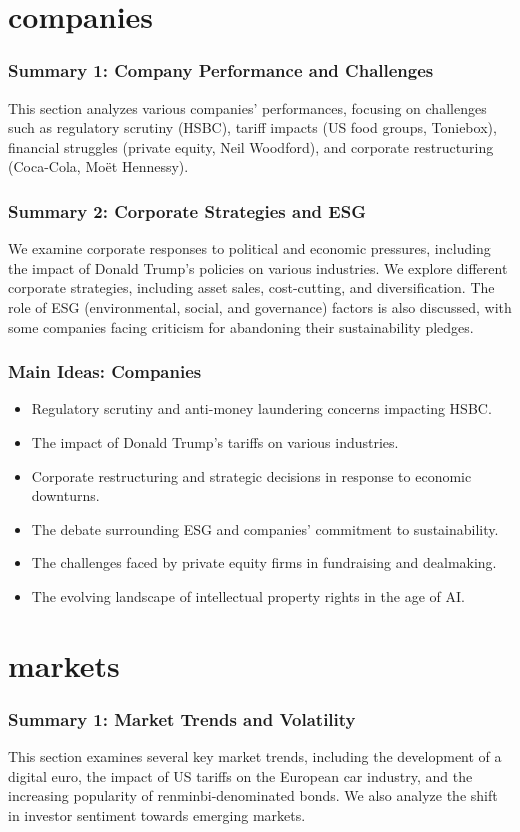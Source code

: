 \documentclass{beamer}
\begin{document}
\section{companies}

\begin{frame}
\frametitle{Summary 1: Company Performance and Challenges}
This section analyzes various companies' performances, focusing on challenges such as regulatory scrutiny (HSBC), tariff impacts (US food groups, Toniebox), financial struggles (private equity, Neil Woodford), and corporate restructuring (Coca-Cola, Moët Hennessy).
\end{frame}

\begin{frame}
\frametitle{Summary 2: Corporate Strategies and ESG}
We examine corporate responses to political and economic pressures, including the impact of Donald Trump's policies on various industries. We explore different corporate strategies, including asset sales, cost-cutting, and diversification. The role of ESG (environmental, social, and governance) factors is also discussed, with some companies facing criticism for abandoning their sustainability pledges.
\end{frame}

\begin{frame}
\frametitle{Main Ideas: Companies}
\begin{itemize}
    \item Regulatory scrutiny and anti-money laundering concerns impacting HSBC.
    \item The impact of Donald Trump's tariffs on various industries.
    \item Corporate restructuring and strategic decisions in response to economic downturns.
    \item The debate surrounding ESG and companies' commitment to sustainability.
    \item The challenges faced by private equity firms in fundraising and dealmaking.
    \item The evolving landscape of intellectual property rights in the age of AI.
\end{itemize}
\end{frame}


\section{markets}

\begin{frame}
\frametitle{Summary 1: Market Trends and Volatility}
This section examines several key market trends, including the development of a digital euro, the impact of US tariffs on the European car industry, and the increasing popularity of renminbi-denominated bonds. We also analyze the shift in investor sentiment towards emerging markets.
\end{frame}
\end{document}

